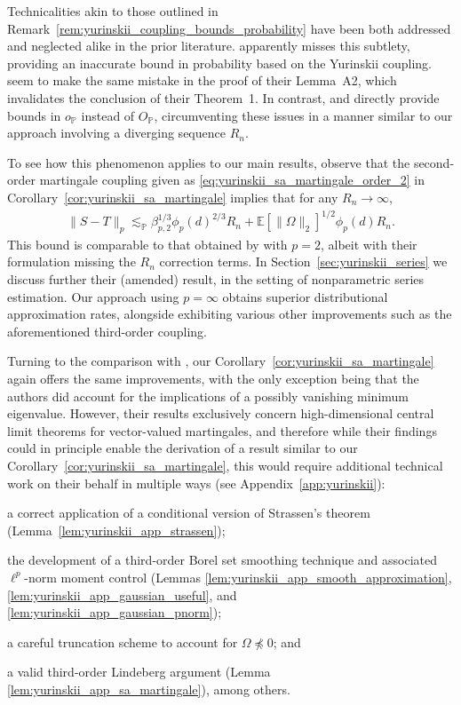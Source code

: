 \documentclass[11pt,lof]{puthesis}
\renewcommand{\P}{\ensuremath{\mathbb{P}}}
\newcommand{\E}{\ensuremath{\mathbb{E}}}
\theoremstyle{break}
\theoremstyle{proof}
\begin{document}
Technicalities akin to those outlined in
Remark~\ref{rem:yurinskii_coupling_bounds_probability} have been both addressed
and
neglected alike in the prior literature. \citet[Chapter 10.4, Example
16]{pollard2002user} apparently misses this subtlety, providing an
inaccurate bound in probability based on the Yurinskii coupling.
\citet{li2020uniform} seem to make the same mistake in the proof of their
Lemma~A2, which invalidates the conclusion of their Theorem~1. In contrast,
\citet{belloni2015some} and \citet{belloni2019conditional} directly provide
bounds in $o_\P$ instead of $O_\P$, circumventing these issues in a manner
similar to our approach involving a diverging sequence $R_n$.

To see how this phenomenon applies to our main results, observe that the
second-order martingale coupling given as
\eqref{eq:yurinskii_sa_martingale_order_2} in
Corollary~\ref{cor:yurinskii_sa_martingale} implies that for any
$R_n \to \infty$,
%
\begin{align*}
  \|S - T\|_p
  \lesssim_\P
  \beta_{p,2}^{1/3}
  \phi_p(d)^{2/3} R_n
  + \E[\|\Omega\|_2]^{1/2}
  \phi_p(d) R_n.
\end{align*}
%
This bound is comparable to that obtained by \citet[Theorem~1]{li2020uniform}
with $p=2$, albeit with their formulation missing the $R_n$ correction terms.
In Section~\ref{sec:yurinskii_series} we discuss further their (amended)
result, in the
setting of nonparametric series estimation. Our approach using
$p = \infty$ obtains superior distributional approximation rates, alongside
exhibiting various other improvements such as the aforementioned third-order
coupling.

Turning to the comparison with \citet{belloni2018high}, our
Corollary~\ref{cor:yurinskii_sa_martingale} again offers the same improvements,
with the
only exception being that the authors did account for the implications of a
possibly vanishing minimum eigenvalue. However, their results exclusively
concern high-dimensional central limit theorems for vector-valued martingales,
and therefore while their findings
could in principle enable the derivation of a result similar to our
Corollary~\ref{cor:yurinskii_sa_martingale}, this would require additional
technical work
on their behalf in multiple ways
(see Appendix~\ref{app:yurinskii}):
%
\begin{inlineroman}
  \item a correct application of a conditional
    version of Strassen's theorem
    (Lemma~\ref{lem:yurinskii_app_strassen});
  \item the development of a third-order Borel set smoothing technique and
    associated $\ell^p$-norm moment control
    (Lemmas \ref{lem:yurinskii_app_smooth_approximation},
      \ref{lem:yurinskii_app_gaussian_useful},
    and \ref{lem:yurinskii_app_gaussian_pnorm});
  \item a careful truncation scheme to account for
    $\Omega\npreceq0$; and
  \item a valid third-order Lindeberg argument
    (Lemma \ref{lem:yurinskii_app_sa_martingale}),
    among others.
\end{inlineroman}
\end{document}
